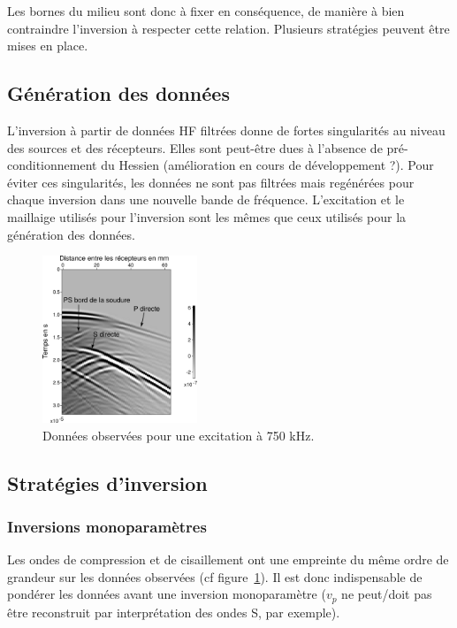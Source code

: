 \documentclass[a4paper,11pt]{report} %
\begin{document}
Les bornes du milieu sont donc à fixer en conséquence, de manière à bien contraindre l'inversion à respecter cette relation. Plusieurs stratégies peuvent être mises en place.

\subsection{Génération des données}

L'inversion à partir de données HF filtrées donne de fortes singularités au niveau des sources et des récepteurs. Elles sont peut-être dues à l'absence de pré-conditionnement du Hessien (amélioration en cours de développement ?). Pour éviter ces singularités, les données ne sont pas filtrées mais regénérées pour chaque inversion dans une nouvelle bande de fréquence. L'excitation et le maillaige utilisés pour l'inversion sont les mêmes que ceux utilisés pour la génération des données.

\begin{figure}[!h]
	\centering
	\includegraphics[height=5cm]{img/multi_trans/data_750k.png}
	\caption{Données observées pour une excitation à 750 kHz.\label{data_obs}}

\end{figure}

\subsection{Stratégies d'inversion}


\subsubsection{Inversions monoparamètres}
Les ondes de compression et de cisaillement ont une empreinte du même ordre de grandeur sur les données observées (cf figure~\ref{data_obs}). Il est donc indispensable de pondérer les données avant une inversion monoparamètre ($v_{p}$ ne peut/doit pas être reconstruit par interprétation des ondes S, par exemple).
\end{document}
